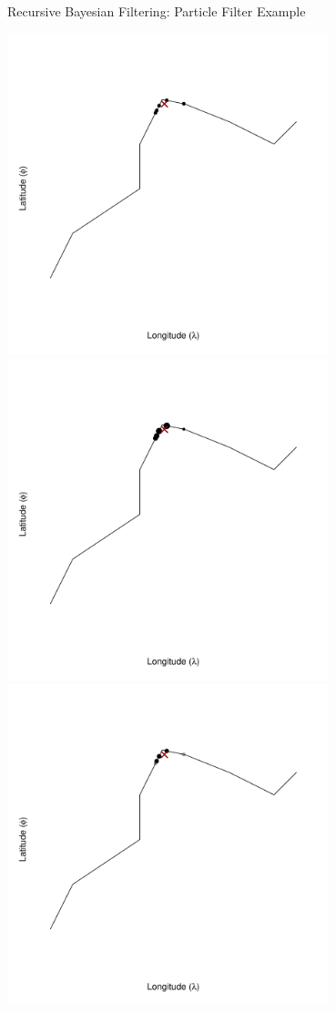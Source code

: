 \documentclass[10pt,t]{beamer}
\begin{document}
\begin{frame}{Recursive Bayesian Filtering: Particle Filter Example}
\begin{overprint}
    \centering
    \includegraphics[width=0.7\textwidth]{figs/pf2-frame4.pdf}
    \centering
    \includegraphics[width=0.7\textwidth]{figs/pf2-frame5.pdf}
    \centering
    \includegraphics[width=0.7\textwidth]{figs/pf2-frame6.pdf}

\end{overprint}
\end{frame}
\end{document}
